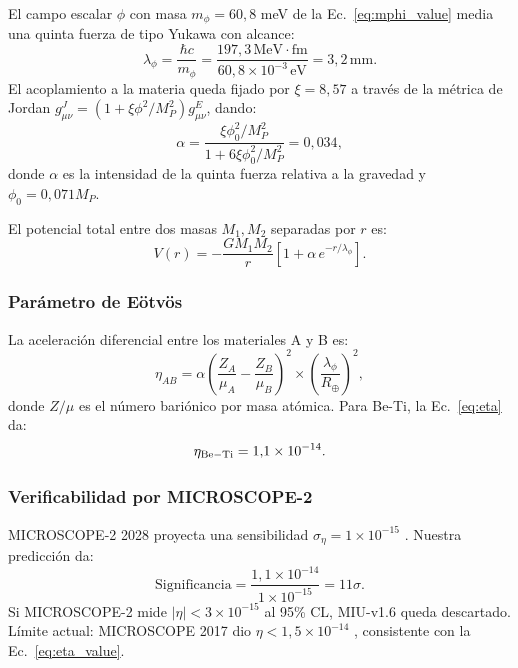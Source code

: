 \documentclass[12pt, a4paper]{article}
\theoremstyle{miuThm}
\theoremstyle{remark}
\begin{document}
El campo escalar $\phi$ con masa $m_\phi = 60{,}8$ meV de la
Ec.~\eqref{eq:mphi_value} media una quinta fuerza de tipo Yukawa con alcance:
\begin{equation}
\lambda_\phi = \frac{\hbar c}{m_\phi} = \frac{197{,}3 \, \text{MeV} \cdot \text{fm}}{60{,}8 \times 10^{-3} \, \text{eV}} = 3{,}2 \, \text{mm}.
\label{eq:lambda}
\end{equation}
El acoplamiento a la materia queda fijado por $\xi = 8{,}57$ a través de la
métrica de Jordan $g_{\mu\nu}^J = (1 + \xi\phi^2/M_P^2) g_{\mu\nu}^E$, dando:
\begin{equation}
\alpha = \frac{\xi\phi_0^2/M_P^2}{1 + 6\xi\phi_0^2/M_P^2} = 0{,}034,
\label{eq:alpha}
\end{equation}
donde $\alpha$ es la intensidad de la quinta fuerza relativa a la gravedad y
$\phi_0 = 0{,}071 M_P$.

El potencial total entre dos masas $M_1, M_2$ separadas por $r$ es:
\begin{equation}
V(r) = -\frac{G M_1 M_2}{r}\left[ 1 + \alpha \, e^{-r/\lambda_\phi} \right].
\label{eq:yukawa}
\end{equation}

\subsubsection{Parámetro de Eötvös}
La aceleración diferencial entre los materiales A y B es:
\begin{equation}
\eta_{AB} = \alpha \left( \frac{Z_A}{\mu_A} - \frac{Z_B}{\mu_B} \right)^2 \times
            \left(\frac{\lambda_\phi}{R_\oplus}\right)^2,
\label{eq:eta}
\end{equation}
donde $Z/\mu$ es el número bariónico por masa atómica. Para Be-Ti, la
Ec.~\eqref{eq:eta} da:
\begin{equation}
\eta_{\rm Be-Ti} = 1{,}1 \times 10^{-14}.
\label{eq:eta_value}
\end{equation}

\subsubsection{Verificabilidad por MICROSCOPE-2}
MICROSCOPE-2 2028 proyecta una sensibilidad $\sigma_\eta = 1 \times 10^{-15}$
\cite{MICROSCOPE2024}. Nuestra predicción da:
\begin{equation}
\text{Significancia} = \frac{1{,}1 \times 10^{-14}}{1 \times 10^{-15}} = 11\sigma.
\label{eq:sigma_eta}
\end{equation}
Si MICROSCOPE-2 mide $|\eta| < 3 \times 10^{-15}$ al 95\% CL, MIU-v1.6 queda
descartado. Límite actual: MICROSCOPE 2017 dio $\eta < 1{,}5 \times 10^{-14}$
\cite{Touboul2017}, consistente con la Ec.~\eqref{eq:eta_value}.
\end{document}
